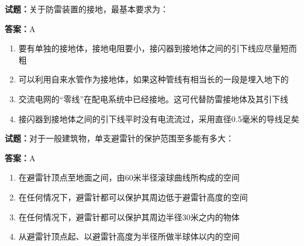 \documentclass{ctexbook}
\begin{document}




\vspace{1em}

\textbf{试题：}关于防雷装置的接地，最基本要求为： 

\textbf{答案：}A 

\begin{enumerate}[leftmargin=3em]
  \item 要有单独的接地体，接地电阻要小，接闪器到接地体之间的引下线应尽量短而粗 

  \item 可以利用自来水管作为接地体，如果这种管线有相当长的一段是埋入地下的 

  \item 交流电网的“零线”在配电系统中已经接地。这可代替防雷接地体及其引下线 

  \item 接闪器到接地体之间的引下线平时没有电流流过，采用直径0.5毫米的导线足矣 

\end{enumerate}





\vspace{1em}

\textbf{试题：}对于一般建筑物，单支避雷针的保护范围至多能有多大： 

\textbf{答案：}A 

\begin{enumerate}[leftmargin=3em]
  \item 在避雷针顶点至地面之间，由60米半径滚球曲线所构成的空间 

  \item 在任何情况下，避雷针都可以保护其周边低于避雷针高度的空间 

  \item 在任何情况下，避雷针都可以保护其周边半径30米之内的物体 

  \item 从避雷针顶点起、以避雷针高度为半径所做半球体以内的空间 

\end{enumerate}





\vspace{1em}
\end{document}
